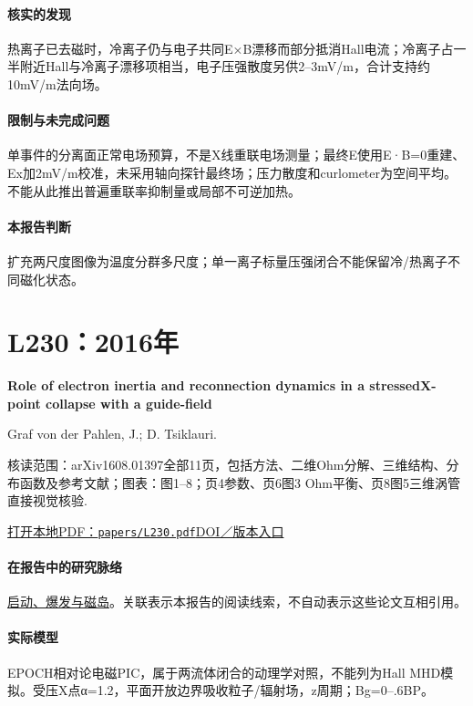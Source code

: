 \documentclass[UTF8,a4paper,11pt,openany,fontset=fandol]{ctexbook}
\begin{document}
\paragraph{核实的发现}热离子已去磁时，冷离子仍与电子共同E×B漂移而部分抵消Hall电流；冷离子占一半附近Hall与冷离子漂移项相当，电子压强散度另供2–3mV/m，合计支持约10mV/m法向场。

\paragraph{限制与未完成问题}单事件的分离面正常电场预算，不是X线重联电场测量；最终E使用E·B=0重建、Ex加2mV/m校准，未采用轴向探针最终场；压力散度和curlometer为空间平均。不能从此推出普遍重联率抑制量或局部不可逆加热。

\paragraph{本报告判断}扩充两尺度图像为温度分群多尺度；单一离子标量压强闭合不能保留冷/热离子不同磁化状态。

\section{L230：2016年}\label{paper:L230}

\textbf{Role of electron inertia and reconnection dynamics in a stressedX-point collapse with a guide-field}\citep{L230}\

Graf von der Pahlen,  J.;  D. Tsiklauri.

\textsf{核读范围：}arXiv1608.01397全部11页，包括方法、二维Ohm分解、三维结构、分布函数及参考文献；\textsf{图表：}图1–8；页4参数、页6图3 Ohm平衡、页8图5三维涡管直接视觉核验.

\href{run:../papers/L230.pdf}{打开本地PDF：\texttt{papers/L230.pdf}}\quad\href{https://doi.org/10.1051/0004-6361/201628071}{DOI／版本入口}

\paragraph{在报告中的研究脉络}\hyperref[story:onset]{启动、爆发与磁岛}。关联表示本报告的阅读线索，不自动表示这些论文互相引用。

\paragraph{实际模型}EPOCH相对论电磁PIC，属于两流体闭合的动理学对照，不能列为Hall MHD模拟。受压X点α=1.2，平面开放边界吸收粒子/辐射场，z周期；Bg=0–.6BP。
\end{document}
